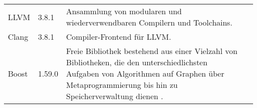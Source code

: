 \begin{longtabu}{p{0.2\textwidth}p{0.1\textwidth}p{0.6\textwidth}p{0.1\textwidth}}
    LLVM       & 3.8.1   & Ansammlung von modularen und wiederverwendbaren
                           Compilern und Toolchains.
                           &\protect\footnotemark{}\\

    Clang      & 3.8.1   & Compiler-Frontend für LLVM.\@
                           &\protect\footnotemark{}\\

    Boost      & 1.59.0  & Freie Bibliothek bestehend aus einer Vielzahl von
                           Bibliotheken, die den unterschiedlichsten
                           Aufgaben von Algorithmen auf Graphen über 
                           Metaprogrammierung bis hin zu Speicherverwaltung
                           dienen
                           \parencite{wikipedia_the_free_encyclopedia_boost_2015}.
                           &\protect\footnotemark{}\\
    \bottomrule
\end{longtabu}

